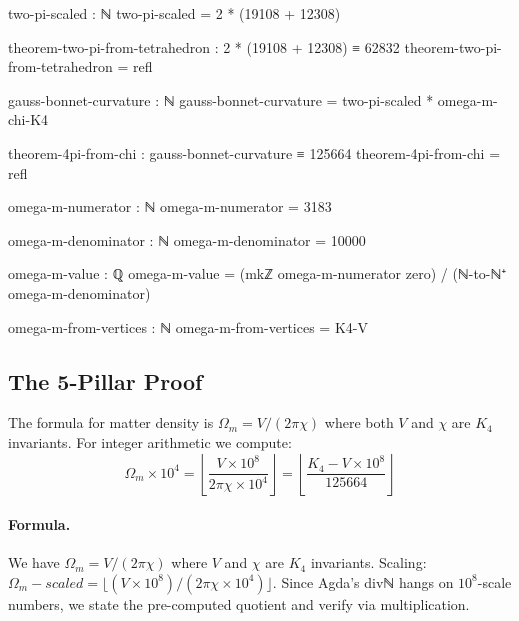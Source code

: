 \documentclass[11pt,a4paper]{book}
\def\texttt#1{#1}%
\def\text#1{#1}%
\begin{document}
\begin{code}
two-pi-scaled : ℕ
two-pi-scaled = 2 * (19108 + 12308)
  
theorem-two-pi-from-tetrahedron : 2 * (19108 + 12308) ≡ 62832
theorem-two-pi-from-tetrahedron = refl

gauss-bonnet-curvature : ℕ
gauss-bonnet-curvature = two-pi-scaled * omega-m-chi-K4

theorem-4pi-from-chi : gauss-bonnet-curvature ≡ 125664
theorem-4pi-from-chi = refl

omega-m-numerator : ℕ
omega-m-numerator = 3183

omega-m-denominator : ℕ
omega-m-denominator = 10000

omega-m-value : ℚ
omega-m-value = (mkℤ omega-m-numerator zero) / (ℕ-to-ℕ⁺ omega-m-denominator)

omega-m-from-vertices : ℕ
omega-m-from-vertices = K4-V
\end{code}

\subsection{The 5-Pillar Proof}

The formula for matter density is $\Omega_m = V/(2\pi\chi)$ where both $V$ and $\chi$ are
$K_4$ invariants. For integer arithmetic we compute:
\[
  \Omega_m \times 10^4 = \left\lfloor \frac{V \times 10^8}{2\pi\chi \times 10^4} \right\rfloor 
  = \left\lfloor \frac{K_4\text{-}V \times 10^8}{125664} \right\rfloor
\]

\paragraph{Formula.}
We have $\Omega_m = V / (2\pi\chi)$ where $V$ and $\chi$ are $K_4$ invariants.
Scaling: $\Omega_m\text{-scaled} = \lfloor(V \times 10^8) / (2\pi\chi \times 10^4)\rfloor$.
Since Agda's \texttt{divℕ} hangs on $10^8$-scale numbers, we state the pre-computed quotient
and verify via multiplication.
\end{document}

